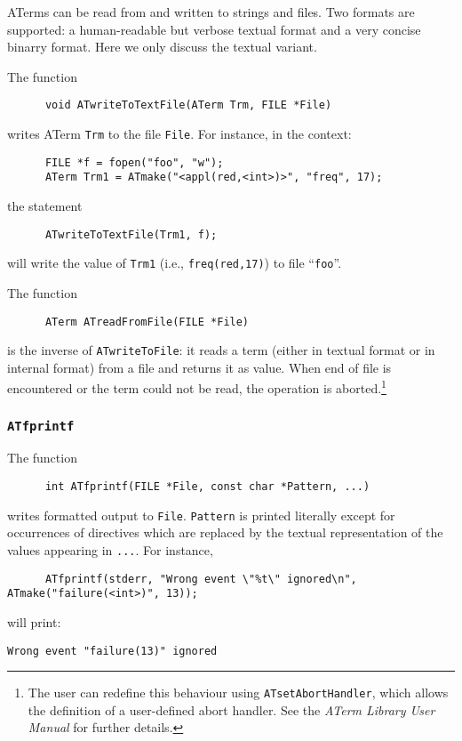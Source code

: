 \documentclass[a4,twoside,noweb]{article} %
\begin{document}
ATerms can be read from and written to strings and files.
Two formats are supported: a human-readable but verbose textual format
and a very concise binarry format. Here we only discuss the textual
variant.

The function
\begin{verbatim}
      void ATwriteToTextFile(ATerm Trm, FILE *File)
\end{verbatim}
writes ATerm {\tt Trm} to the file {\tt File}.
For instance, in the context:
\begin{verbatim}
      FILE *f = fopen("foo", "w");
      ATerm Trm1 = ATmake("<appl(red,<int>)>", "freq", 17);
\end{verbatim}
the statement
\begin{verbatim}
      ATwriteToTextFile(Trm1, f);
\end{verbatim}
will write the value of {\tt Trm1} (i.e., {\tt freq(red,17)})
to file ``{\tt foo}''.

The function
\begin{verbatim}
      ATerm ATreadFromFile(FILE *File)
\end{verbatim}
is the inverse of {\tt ATwriteToFile}: it reads a term (either in textual format or in internal format)
from a file and returns it as value. When end of file is encountered
or the term could not be read, the operation is aborted.\footnote{The user can redefine this behaviour
using {\tt ATsetAbortHandler}, which allows the definition of a user-defined abort handler.
See the \emph{ATerm Library User Manual} for further details.}

\subsubsection{\label{ATprintf}{\tt ATfprintf}}
The function
\begin{verbatim}
      int ATfprintf(FILE *File, const char *Pattern, ...)
\end{verbatim}
writes formatted output to {\tt File}.
{\tt Pattern} is printed literally except for occurrences
of directives which are replaced by the textual representation
of the values appearing in {\tt ...}. For instance,
\begin{verbatim}
      ATfprintf(stderr, "Wrong event \"%t\" ignored\n", ATmake("failure(<int>)", 13));
\end{verbatim}
will print:
\begin{verbatim}
Wrong event "failure(13)" ignored
\end{verbatim}
\end{document}
